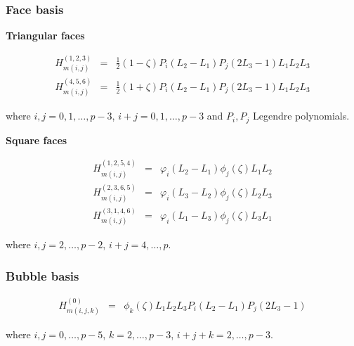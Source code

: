 \subsubsection{Face basis}

\noindent \textbf{Triangular faces}

\begin{eqnarray*}
H_{m(i,j)}^{(1,2,3)}&=&\frac{1}{2}(1-\zeta) P_i(L_2-L_1)
P_j(2L_3-1)L_1L_2L_3 \\
H_{m(i,j)}^{(4,5,6)}&=&\frac{1}{2}(1+\zeta) P_i(L_2-L_1)
P_j(2L_3-1)L_1L_2L_3
\end{eqnarray*}

\noindent where $i,j=0,1,\ldots,p-3$, $i+j=0,1,\ldots,p-3$ and
$P_i,P_j$ Legendre polynomials.

\noindent \textbf{Square faces}

\begin{eqnarray*}
H_{m(i,j)}^{(1,2,5,4)}&=&\varphi_i(L_2-L_1)\phi_j(\zeta)L_1L_2 \\
H_{m(i,j)}^{(2,3,6,5)}&=&\varphi_i(L_3-L_2)\phi_j(\zeta)L_2L_3 \\
H_{m(i,j)}^{(3,1,4,6)}&=&\varphi_i(L_1-L_3)\phi_j(\zeta)L_3L_1
\end{eqnarray*}

\noindent where $i,j=2,\ldots,p-2$, $i+j=4,\ldots,p$.

\subsubsection{Bubble basis}

\begin{eqnarray*}
H_{m(i,j,k)}^{(0)}&=&\phi_k(\zeta)L_1L_2L_3 P_i(L_2-L_1) P_j(2L_3-1)
\end{eqnarray*}

\noindent where $i,j=0,\ldots,p-5$, $k=2,\ldots,p-3$,
$i+j+k=2,\ldots,p-3$.



% 


